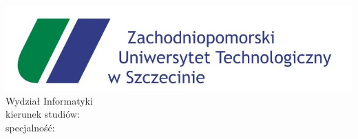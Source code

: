 %

\begingroup
\firaoldstyle  %
\centering %
\thispagestyle{empty} %

    \includegraphics[scale=.4]{Assets/chapter_0-title_page/logo5.jpg}\\[.75cm]

Wydział Informatyki\\[.25cm]
kierunek studiów: \field\\[.25cm]
specjalność: \speciality\\[1.75cm]
{\Large \degreename}\\[1cm]

\Large {\bfseries \MakeUppercase  \ttitle }\\[.5cm]%
\large {\bfseries \MakeUppercase \ttitleEng} \\[.5cm]%

